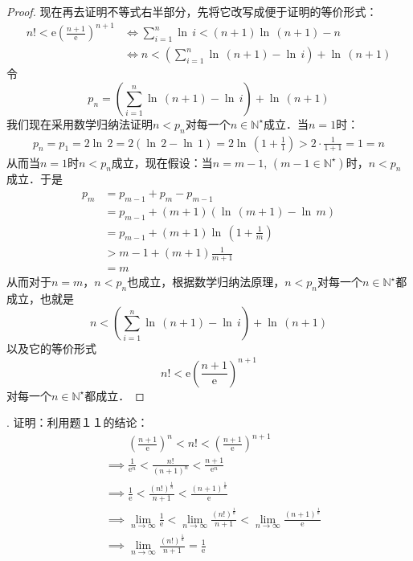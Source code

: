 \documentclass{ctexart}
\theoremstyle{definition}
\theoremstyle{definition}
\theoremstyle{plain}
\theoremstyle{plain}
\theoremstyle{plain}
\theoremstyle{definition}
\begin{document}
\begin{proof}
\noindent 现在再去证明不等式右半部分，先将它改写成便于证明的等价形式：
\begin{align}
    n! < \mathrm{e}\left(\frac{n+1}{\mathrm{e}}\right)^{n+1} &\iff \sum_{i=1}^n \ln \, i < (n+1)\ln \, \left(n+1\right) - n \\
    &\iff n < \left( \sum_{i=1}^n \ln \, \left(n+1\right) - \ln \, i \right) + \ln \, \left(n+1\right)
\end{align}
令
\begin{equation}
    p_n = \left( \sum_{i=1}^n \ln \, \left(n+1\right) - \ln \, i \right) + \ln \, \left(n+1\right)
\end{equation}
我们现在采用数学归纳法证明$n < p_n$对每一个$n\in\mathbb{N}^\star$成立．当$n=1$时：
\begin{align}
    p_n = p_1 = 2 \ln \, 2 = 2 \left( \ln \, 2 - \ln \, 1\right) = 2 \ln \, \left( 1 + \frac{1}{1} \right) > 2 \cdot \frac{1}{1+1} = 1 = n
\end{align}
从而当$n=1$时$n < p_n$成立，现在假设：当$n=m-1, \, (m-1 \in \mathbb{N}^\star)$时，$n < p_n$成立．于是
\begin{align}
    p_m &= p_{m-1} + p_{m} - p_{m-1} \\
    &= p_{m-1} + (m+1) \left( \ln \, \left(m+1\right) - \ln \, m \right) \\
    &= p_{m-1} + (m+1) \ln \, \left(1 + \frac{1}{m}\right) \\
    &> m-1 + (m+1) \frac{1}{m+1} \\
    &= m
\end{align}
从而对于$n=m$，$n < p_n$也成立，根据数学归纳法原理，$n < p_n$对每一个$n \in \mathbb{N}^\star$都成立，也就是
\begin{equation}
    n < \left( \sum_{i=1}^n \ln \, \left(n+1\right) - \ln \, i \right) + \ln \, \left(n+1\right)
\end{equation}
以及它的等价形式
\begin{equation}
    n! < \mathrm{e}\left(\frac{n+1}{\mathrm{e}}\right)^{n+1}
\end{equation}
对每一个$n \in \mathbb{N}^\star$都成立．
\end{proof}
. 证明：利用题１１的结论：
\begin{align}
    &\phantom{\implies} \left(\frac{n+1}{\mathrm{e}}\right)^n < n! < \left(\frac{n+1}{\mathrm{e}}\right)^{n+1} \\
    &\implies \frac{1}{\mathrm{e}^n} < \frac{n!}{(n+1)^n} < \frac{n+1}{\mathrm{e}^n} \\
    &\implies \frac{1}{\mathrm{e}} < \frac{(n!)^\frac{1}{n}}{n+1} < \frac{(n+1)^\frac{1}{n}}{\mathrm{e}} \\
    &\implies \lim_{n\to\infty} \frac{1}{\mathrm{e}} < \lim_{n \to \infty} \frac{(n!)^\frac{1}{n}}{n+1} < \lim_{n\to\infty} \frac{(n+1)^\frac{1}{n}}{\mathrm{e}} \\
    &\implies \lim_{n\to\infty} \frac{(n!)^\frac{1}{n}}{n+1} = \frac{1}{\mathrm{e}}
\end{align}
\end{document}
